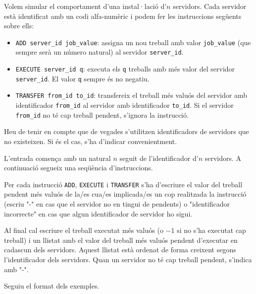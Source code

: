 

\Statement

Volem simular el comportament d'una instal·lació d'$n$ servidors. Cada servidor està identificat amb un codi alfa-numèric i podem fer les instruccions següents sobre ells:

\begin{itemize}
\item \texttt{ADD server\_id job\_value}: assigna un nou treball amb valor \texttt{job\_value} (que sempre serà un número natural) al servidor \texttt{server\_id}.
\item \texttt{EXECUTE server\_id q}: executa els \texttt{q} treballs amb més valor del servidor \texttt{server\_id}. El valor \texttt{q} sempre és no negatiu.
\item \texttt{TRANSFER from\_id to\_id}: transfereix el treball més valuós del servidor amb identificador \texttt{from\_id} al servidor amb identificador \texttt{to\_id}. Si el servidor \texttt{from\_id} no té cap treball pendent, s'ignora la instrucció.
\end{itemize}

Heu de tenir en compte que de vegades s'utilitzen identificadors de servidors que no existeixen. Si és el cas, s'ha d'indicar convenientment.


\Input

L'entrada comença amb un natural $n$ seguit de l'identificador d'$n$ servidors. A continuació segueix una seqüència d'instruccions.

\Output

Per cada instrucció \texttt{ADD}, \texttt{EXECUTE} i \texttt{TRANSFER} s'ha d'escriure el valor del treball pendent més valuós de la/es cua/es implicada/es un cop realitzada la instrucció (escriu "-" en cas que el servidor no en tingui de pendents) o "identificador incorrecte" en cas que algun identificador de servidor ho sigui.

\medskip

Al final cal escriure el treball executat més valuós (o $-1$ si no s'ha executat cap treball) i un llistat amb el valor del treball més valuós pendent d'executar en cadascun dels servidors. Aquest llistat està ordenat de forma creixent segons l'identificador dels servidors. Quan un servidor no té cap treball pendent, s'indica amb "-". 

\medskip

Seguiu el format dels exemples.

\Sample

